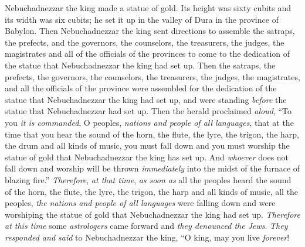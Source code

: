 \begin{biblechapter} %
 Nebuchadnezzar the king made a statue of gold. Its height was sixty cubits and its width was six cubits; he set it up in the valley of Dura in the province of Babylon.
\verse Then Nebuchadnezzar the king sent directions to assemble the satraps, the prefects, and the governors, the counselors, the treasurers, the judges, the magistrates and all of the officials of the provinces to come to the dedication of the statue that Nebuchadnezzar the king had set up.
\verse Then the satraps, the prefects, the governors, the counselors, the treasurers, the judges, the magistrates, and all the officials of the province were assembled for the dedication of the statue that Nebuchadnezzar the king had set up, and were standing \textit{before} the statue that Nebuchadnezzar had set up.
\verse Then the herald proclaimed \textit{aloud}, “To you \textit{it is commanded}, O peoples, \textit{nations and people of all languages},
\verse that at the time that you hear the sound of the horn, the flute, the lyre, the trigon, the harp, the drum and all kinds of music, you must fall down and you must worship the statue of gold that Nebuchadnezzar the king has set up.
\verse And \textit{whoever} does not fall down and worship will be thrown \textit{immediately} into the midst of the furnace of blazing fire.”
\verse \textit{Therefore}, \textit{at that time}, \textit{as soon as} all the peoples heard the sound of the horn, the flute, the lyre, the trigon, the harp and all kinds of music, all the peoples, \textit{the nations and people of all languages} were falling down and were worshiping the statue of gold that Nebuchadnezzar the king had set up.
\verse \textit{Therefore} \textit{at this time} some \textit{astrologers} came forward and \textit{they denounced the Jews}.
\verse \textit{They responded and said} to Nebuchadnezzar the king, “O king, may you live \textit{forever}!

\end{biblechapter}
